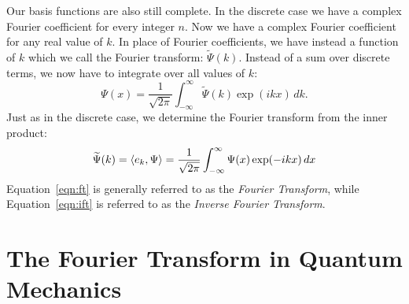 \documentclass[12pt]{book}
\begin{document}
Our basis functions are also still complete.  In the discrete case we have a complex Fourier coefficient for every integer $n$.   Now we have a complex Fourier coefficient for any real value of $k$.  In place of Fourier coefficients, we have instead a function of $k$ which we call the Fourier transform: $\widetilde{\Psi}(k)$.
Instead of a sum over discrete terms, we now have to integrate over all values of $k$:
\begin{equation} \label{eqn:ift}
\Psi(x) = \frac{1}{\sqrt{2\pi}} \int_{-\infty}^{\infty} \widetilde{\Psi}(k) \exp(ikx) \, dk.
\end{equation}
Just as in the discrete case, we determine the Fourier transform from the inner product:
\begin{equation} \label{eqn:ft}
\widetilde{\Psi}(k) = \braket{e_k, \Psi} = \frac{1}{\sqrt{2\pi}} \int_{-\infty}^{\infty} {\Psi}(x) \exp(-ikx) \, dx
\end{equation}
Equation~\ref{eqn:ft} is generally referred to as the {\em Fourier Transform}, while Equation~\ref{eqn:ift} is referred to as the {\em Inverse Fourier Transform}.

\section{The Fourier Transform in Quantum Mechanics}
\end{document}
